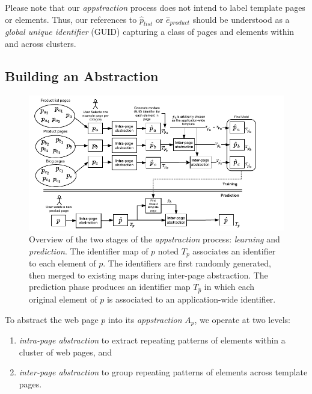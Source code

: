Please note that our \emph{appstraction} process does not intend to label template pages or elements.
Thus, our references to $\hat{p}_{list}$ or $\hat{e}_{product}$ should be understood as a \emph{global unique identifier} (GUID) capturing a class of pages and elements within and across clusters.

\subsection{Building an Abstraction}

\begin{figure}[ht]
  \centering
  \includegraphics[width=0.8\linewidth]{appstract/explanations/appstract_overview}
  \caption{Overview of the two stages of the \emph{appstraction} process: \emph{learning} and \emph{prediction}. The identifier map of $p$ noted $T_p$ associates an identifier to each element of $p$. The identifiers are first randomly generated, then merged to existing maps during inter-page abstraction. The prediction phase produces an identifier map $T_{\hat{p}}$ in which each original element of $p$ is associated to an application-wide identifier.}
  \label{fig:appstract_overview}
\end{figure}

To abstract the web page $p$ into its \emph{appstraction} $A_p$, we operate at two levels:
\begin{enumerate}
  \item \textit{intra-page abstraction} to extract repeating patterns of elements within a cluster of web pages, and
  \item \textit{inter-page abstraction} to group repeating patterns of elements across template pages.
\end{enumerate}

